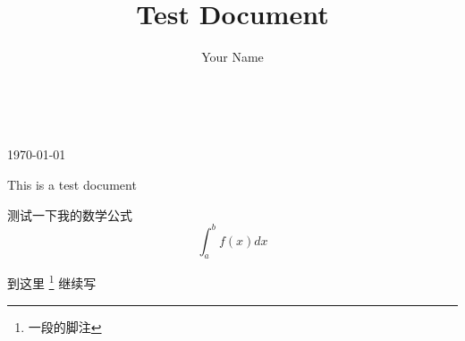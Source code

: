 \documentclass[a4paper,11pt,twoside,openany]{article}
\begin{document}
\tableofcontents
\thispagestyle{empty} 　　　%
\author{Your Name}
\title{Test Document}
\maketitle
\today %


This is a test document
\newline %

测试一下我的数学公式\[\int_a^b f(x)dx\]

到这里
\footnote{一段的脚注}
继续写
\end{document}
